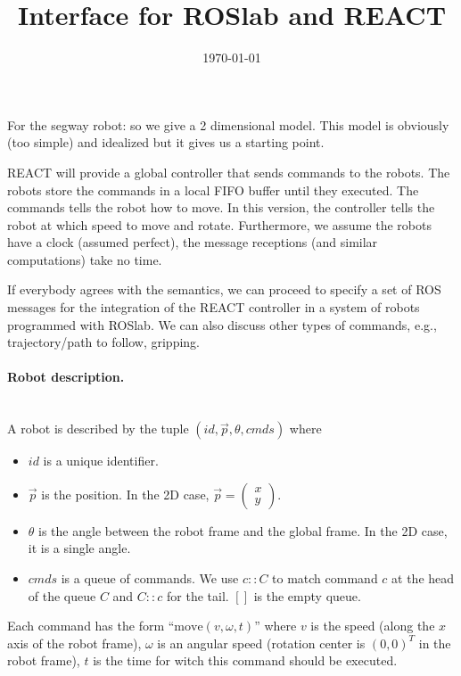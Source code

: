 \documentclass{article}
\title{Interface for ROSlab and REACT}
\date{\today}
\begin{document}
\maketitle

\newcommand{\tr}[1]{\stackrel{#1}{\longrightarrow}}

For the segway robot: so we give a 2 dimensional model.
This model is obviously (too simple) and idealized but it gives us a starting point.

REACT will provide a global controller that sends commands to the robots.
The robots store the commands in a local FIFO buffer until they executed.
The commands tells the robot how to move.
In this version, the controller tells the robot at which speed to move and rotate.
Furthermore, we assume the robots have a clock (assumed perfect), the message receptions (and similar computations) take no time.

If everybody agrees with the semantics, we can proceed to specify a set of ROS messages for the integration of the REACT controller in a system of robots programmed with ROSlab.
We can also discuss other types of commands, e.g., trajectory/path to follow, gripping.

\paragraph{Robot description.}~\\

A robot is described by the tuple $(id, \vec p, \theta, \mathit{cmds})$ where
\begin{itemize}
\item $id$ is a unique identifier.
\item $\vec p$ is the position. In the 2D case, $\vec p = \begin{pmatrix} x \\ y \end{pmatrix}$.
\item $\theta$ is the angle between the robot frame and the global frame. In the 2D case, it is a single angle.
\item $\mathit{cmds}$ is a queue of commands. We use $c::C$ to match command $c$ at the head of the queue $C$ and $C::c$ for the tail. $[]$ is the empty queue.
\end{itemize}

Each command has the form ``$\text{move}(v, \omega, t)$'' where
$v$ is the speed (along the $x$ axis of the robot frame),
$\omega$ is an angular speed (rotation center is $(0,0)^T$ in the robot frame),
$t$ is the time for witch this command should be executed.
\end{document}
